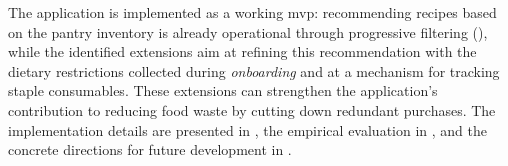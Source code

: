 The application is implemented as a working \gls{mvp}: recommending recipes based on the pantry inventory is already operational through progressive filtering (), while the identified extensions aim at refining this recommendation with the dietary restrictions collected during \textit{onboarding} and at a mechanism for tracking staple consumables.
These extensions can strengthen the application's contribution to reducing food waste by cutting down redundant purchases.
The implementation details are presented in , the empirical evaluation in , and the concrete directions for future development in .
